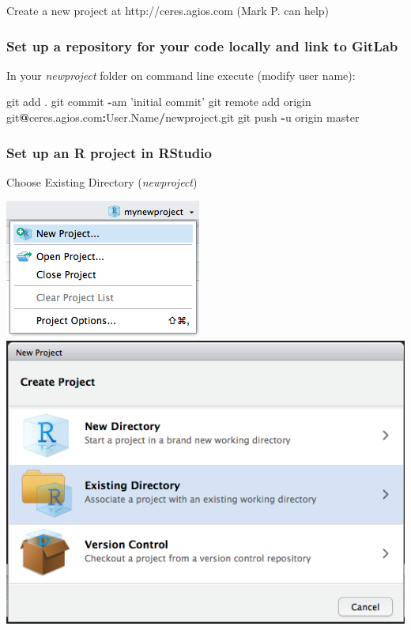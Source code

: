 \documentclass[openany]{article}
\newenvironment{Shaded}{\begin{snugshade}}{\end{snugshade}}
\newcommand{\NormalTok}[1]{#1}
\newcommand{\OperatorTok}[1]{\textcolor[rgb]{0.81,0.36,0.00}{\textbf{#1}}}
\newcommand{\StringTok}[1]{\textcolor[rgb]{0.31,0.60,0.02}{#1}}
\begin{document}
Create a new project at http://ceres.agios.com (Mark P. can help)

\hypertarget{set-up-a-repository-for-your-code-locally-and-link-to-gitlab}{%
\subsubsection{Set up a repository for your code locally and link to GitLab}\label{set-up-a-repository-for-your-code-locally-and-link-to-gitlab}}

In your \emph{newproject} folder on command line execute (modify user name):

\begin{Shaded}
\begin{Highlighting}[]
\NormalTok{git add .}
\NormalTok{git commit }\OperatorTok{-}\NormalTok{am }\StringTok{'initial commit'}
\NormalTok{git remote add origin git}\OperatorTok{@}\NormalTok{ceres.agios.com}\OperatorTok{:}\NormalTok{User.Name}\OperatorTok{/}\NormalTok{newproject.git}
\NormalTok{git push }\OperatorTok{-}\NormalTok{u origin master }
\end{Highlighting}
\end{Shaded}

\hypertarget{set-up-an-r-project-in-rstudio}{%
\subsubsection{Set up an R project in RStudio}\label{set-up-an-r-project-in-rstudio}}

Choose Existing Directory (\emph{newproject})

\includegraphics[width=0.6\linewidth]{images/newproject0}
\includegraphics[width=0.6\linewidth]{images/newproject}
\end{document}

